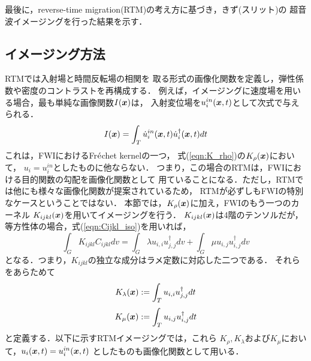 ﻿最後に，reverse-time migration(RTM)の考え方に基づき，きず(スリット)の
超音波イメージングを行った結果を示す．
\subsection{イメージング方法}
RTMでは入射場と時間反転場の相関を
取る形式の画像化関数を定義し，弾性係数や密度のコントラストを再構成する．
例えば，イメージングに速度場を用いる場合，最も単純な画像関数$I(\boldsymbol{x})$は，
入射変位場を$u_i^{in}(\boldsymbol{x},t)$として次式で与えられる．
\begin{equation}
	I(\boldsymbol{x})=\int_T \dot u^{in}_i(\boldsymbol{x},t) \dot u_i^{\dagger}(\boldsymbol{x},t)dt
	\label{eqn:Ix}
\end{equation}
これは，FWIにおけるFr$\acute{\rm e}$chet kernelの一つ，
式(\ref{eqn:K_rho})の$K_\rho(\boldsymbol{x})$において，
$u_i=u_i^{in}$としたものに他ならない．
つまり，この場合のRTMは，FWIにおける目的関数の勾配を画像化関数として
用ていることになる．ただし，RTMでは他にも様々な画像化関数が提案されているため\cite{Jones}，
RTMが必ずしもFWIの特別なケースということではない．
本節では，$K_\rho(\boldsymbol{x})$に加え，FWIのもう一つのカーネル
$K_{ijkl}(\boldsymbol{x})$を用いてイメージングを行う．
$K_{ijkl}(\boldsymbol{x})$は4階のテンソルだが，
等方性体の場合，式(\ref{eqn:Cijkl_iso})を用いれば，
\begin{equation}
	\int_G K_{ijkl}C_{ijkl}dv
	=
	\int_G \lambda u_{i,i}u^{\dagger}_{j,j} dv
	+
	\int_G \mu u_{i,j}u^{\dagger}_{i,j} dv
	\label{eqn:}
\end{equation}
となる．つまり，$K_{ijkl}$の独立な成分はラメ定数に対応した二つである．
それらをあらためて
\begin{equation}
	K_\lambda(\boldsymbol{x}):= \int_T u_{i,i}u^{\dagger}_{j,j} dt
	\label{eqn:K_lmb}
\end{equation}
\begin{equation}
	K_\mu(\boldsymbol{x}):= \int_T u_{i,j}u^{\dagger}_{i,j} dt
	\label{eqn:K_mu}
\end{equation}
と定義する．以下に示すRTMイメージングでは，これら
$K_\rho, K_\lambda$および$K_\mu$において，$u_i(\boldsymbol{x},t)=u_i^{in}(\boldsymbol{x},t)$
としたものも画像化関数として用いる．
